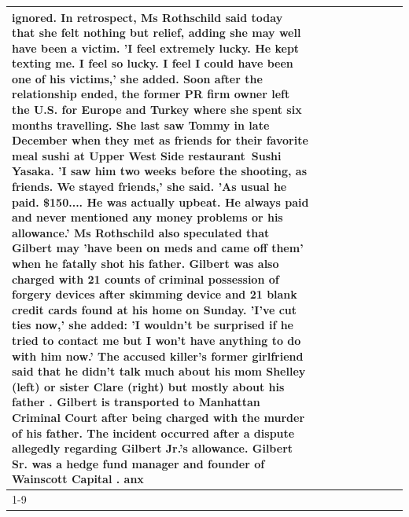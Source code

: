 \begin{table}[H]
\begin{tabular}{lllrlllll}
ignored. In retrospect, Ms Rothschild said today that she felt nothing but relief, adding she may well have been a victim. 'I feel extremely lucky. He kept texting me. I feel so lucky. I feel I could have been one of his victims,' she added. Soon after the relationship ended, the former PR firm owner left the U.S. for Europe and Turkey where she spent six months  travelling. She last saw Tommy in late December when they met as friends for their favorite meal sushi at Upper West Side restaurant Sushi Yasaka. 'I saw him two weeks before the shooting, as friends. We stayed friends,' she said. 'As usual he paid. \$150.... He was actually upbeat. He always paid and never mentioned any money problems or his allowance.' Ms Rothschild also speculated that Gilbert may 'have been on meds and came off them' when he fatally shot his father. Gilbert was also charged with 21 counts of criminal possession of forgery devices after skimming device and 21 blank credit cards found at his home on Sunday. 'I've cut ties now,' she added: 'I wouldn’t be surprised if he tried to contact me but I won’t have anything to do with him now.' The accused killer's former girlfriend said that he didn't talk much about his mom Shelley (left) or sister Clare (right) but mostly about his father . Gilbert is transported to Manhattan Criminal Court  after being charged with the murder of his father. The incident occurred after a dispute allegedly regarding Gilbert Jr.'s allowance. Gilbert Sr. was a hedge fund manager and founder of Wainscott Capital . anx \\
\cline{1-9}

\end{tabular}
\end{table}
